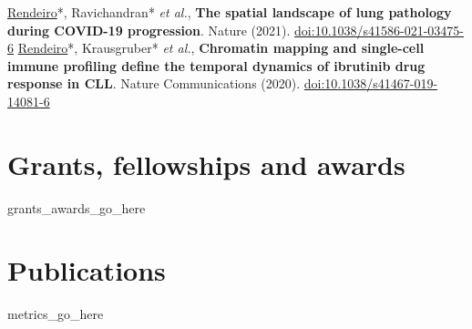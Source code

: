 \documentclass[11pt,a4paper,roman]{moderncv} %
\begin{document}
        {\underline{Rendeiro}*, Ravichandran* \textit{et al.}, \textbf{The spatial landscape of lung pathology during COVID-19 progression}. Nature (2021). \href{https://doi.org/10.1038/s41586-021-03475-6}{doi:10.1038/s41586-021-03475-6}}
        {\underline{Rendeiro}*, Krausgruber* \textit{et al.}, \textbf{Chromatin mapping and single-cell immune profiling define the temporal dynamics of ibrutinib drug response in CLL}. Nature Communications (2020). \href{https://doi.org/10.1038/s41467-019-14081-6}{doi:10.1038/s41467-019-14081-6}}

\section{Grants, fellowships and awards}
    {{grants_awards_go_here}}


\section{Publications}
    {{metrics_go_here}}
\end{document}
